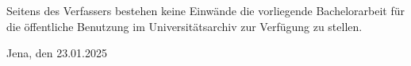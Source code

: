 \documentclass[a4paper, 12pt]{article}
\begin{document}


\newpage

\thispagestyle{empty} 
\tableofcontents
\newpage

















\clearpage

\printbibliography



\newpage
\thispagestyle{empty} 




\begin{otherlanguage}{ngerman}


Seitens des Verfassers bestehen keine Einwände die vorliegende Bachelorarbeit für die öffentliche Benutzung im
Universitätsarchiv zur Verfügung zu stellen.
\end{otherlanguage}

\vspace{30mm}

{\raggedleft 
Jena, den 23.01.2025 \\
}
\end{document}
